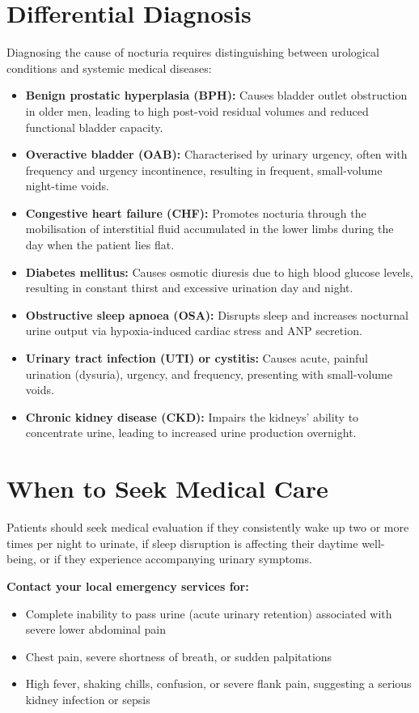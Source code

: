 \section*{Differential Diagnosis}
Diagnosing the cause of nocturia requires distinguishing between urological conditions and systemic medical diseases:
\begin{itemize}
    \item \textbf{Benign prostatic hyperplasia (BPH):} Causes bladder outlet obstruction in older men, leading to high post-void residual volumes and reduced functional bladder capacity.
    \item \textbf{Overactive bladder (OAB):} Characterised by urinary urgency, often with frequency and urgency incontinence, resulting in frequent, small-volume night-time voids.
    \item \textbf{Congestive heart failure (CHF):} Promotes nocturia through the mobilisation of interstitial fluid accumulated in the lower limbs during the day when the patient lies flat.
    \item \textbf{Diabetes mellitus:} Causes osmotic diuresis due to high blood glucose levels, resulting in constant thirst and excessive urination day and night.
    \item \textbf{Obstructive sleep apnoea (OSA):} Disrupts sleep and increases nocturnal urine output via hypoxia-induced cardiac stress and ANP secretion.
    \item \textbf{Urinary tract infection (UTI) or cystitis:} Causes acute, painful urination (dysuria), urgency, and frequency, presenting with small-volume voids.
    \item \textbf{Chronic kidney disease (CKD):} Impairs the kidneys' ability to concentrate urine, leading to increased urine production overnight.
\end{itemize}

\section*{When to Seek Medical Care}
Patients should seek medical evaluation if they consistently wake up two or more times per night to urinate, if sleep disruption is affecting their daytime well-being, or if they experience accompanying urinary symptoms.

\textbf{Contact your local emergency services for:}
\begin{itemize}
    \item Complete inability to pass urine (acute urinary retention) associated with severe lower abdominal pain
    \item Chest pain, severe shortness of breath, or sudden palpitations
    \item High fever, shaking chills, confusion, or severe flank pain, suggesting a serious kidney infection or sepsis
\end{itemize}

